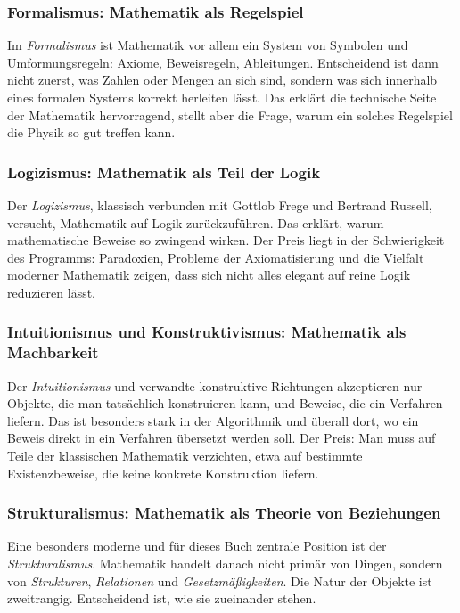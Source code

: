 \subsubsection*{Formalismus: Mathematik als Regelspiel}

Im \emph{Formalismus} ist Mathematik vor allem ein System von Symbolen und Umformungsregeln:
Axiome,
Beweisregeln,
Ableitungen.
Entscheidend ist dann nicht zuerst,
was Zahlen oder Mengen an sich sind,
sondern was sich innerhalb eines formalen Systems korrekt herleiten lässt.
Das erklärt die technische Seite der Mathematik hervorragend,
stellt aber die Frage,
warum ein solches Regelspiel die Physik so gut treffen kann.

\subsubsection*{Logizismus: Mathematik als Teil der Logik}

Der \emph{Logizismus},
klassisch verbunden mit Gottlob Frege
und Bertrand Russell,
versucht,
Mathematik auf Logik zurückzuführen.
Das erklärt,
warum mathematische Beweise so zwingend wirken.
Der Preis liegt in der Schwierigkeit des Programms:
Paradoxien,
Probleme der Axiomatisierung
und die Vielfalt moderner Mathematik zeigen,
dass sich nicht alles elegant auf reine Logik reduzieren lässt.

\subsubsection*{Intuitionismus und Konstruktivismus: Mathematik als Machbarkeit}

Der \emph{Intuitionismus}
und verwandte konstruktive Richtungen akzeptieren nur Objekte,
die man tatsächlich konstruieren kann,
und Beweise,
die ein Verfahren liefern.
Das ist besonders stark in der Algorithmik
und überall dort,
wo ein Beweis direkt in ein Verfahren übersetzt werden soll.
Der Preis:
Man muss auf Teile der klassischen Mathematik verzichten,
etwa auf bestimmte Existenzbeweise,
die keine konkrete Konstruktion liefern.

\subsubsection*{Strukturalismus: Mathematik als Theorie von Beziehungen}

Eine besonders moderne
und für dieses Buch zentrale Position
ist der \emph{Strukturalismus}.
Mathematik handelt danach nicht primär von Dingen,
sondern von \emph{Strukturen},
\emph{Relationen}
und \emph{Gesetzmäßigkeiten}.
Die Natur der Objekte ist zweitrangig.
Entscheidend ist,
wie sie zueinander stehen.

